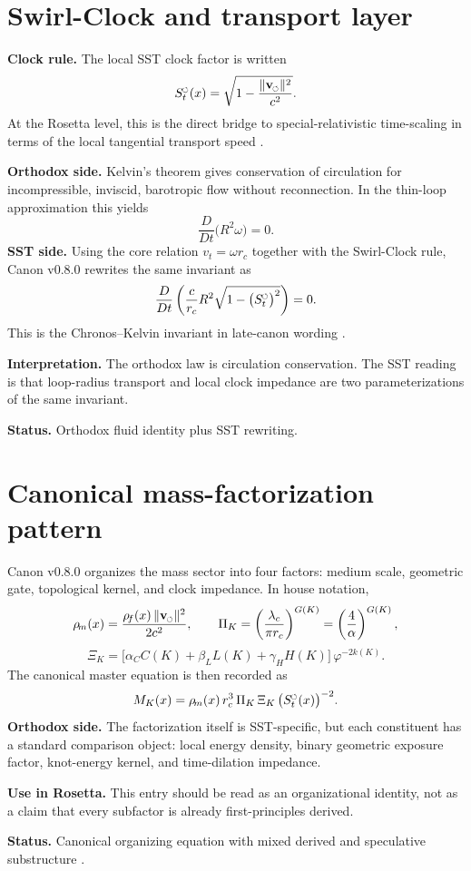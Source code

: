 \documentclass[11pt,a4paper]{article}
\newcommand{\swirlarrow}{%
  \mathchoice{\mkern-2mu\scriptstyle\boldsymbol{\circlearrowleft}}%
  {\mkern-2mu\scriptstyle\boldsymbol{\circlearrowleft}}%
  {\mkern-2mu\scriptscriptstyle\boldsymbol{\circlearrowleft}}%
  {\mkern-2mu\scriptscriptstyle\boldsymbol{\circlearrowleft}}%
}
\newcommand{\vswirl}{\mathbf{v}_{\swirlarrow}}
\newcommand{\rhoF}{\rho_{\!f}}
\newcommand{\rhoM}{\rho_{\!m}}
\newcommand{\vnorm}{\lVert \vswirl \rVert}
\newcommand{\rc}{r_c}
\newcommand{\RosettaCard}[1]{\begin{tcolorbox}[colback=blue!4,colframe=blue!60!black,boxrule=0.6pt,arc=3pt,title={#1}]}
\newcommand{\EndRosettaCard}{\end{tcolorbox}}
\begin{document}
\section{Swirl-Clock and transport layer}
\RosettaCard{Rosetta Card 2: Swirl-Clock and Chronos--Kelvin transport}
\textbf{Clock rule.} The local SST clock factor is written
\[
S_t^{\swirlarrow}(x)=\sqrt{1-\frac{\vnorm^2}{c^2}}.
\]
At the Rosetta level, this is the direct bridge to special-relativistic time-scaling in terms of the local tangential transport speed \cite{SSTCanon08}.\par
\medskip
\textbf{Orthodox side.} Kelvin's theorem gives conservation of circulation for incompressible, inviscid, barotropic flow without reconnection. In the thin-loop approximation this yields
\[
\frac{D}{Dt}\bigl(R^2\omega\bigr)=0.
\]
\textbf{SST side.} Using the core relation \(v_t=\omega\rc\) together with the Swirl-Clock rule, Canon v0.8.0 rewrites the same invariant as
\[
\frac{D}{Dt}\left(\frac{c}{\rc}R^2\sqrt{1-\bigl(S_t^{\swirlarrow}\bigr)^2}\right)=0.
\]
This is the Chronos--Kelvin invariant in late-canon wording \cite{SSTCanon08, Helmholtz1858, Batchelor1967, Saffman1992}.\par
\medskip
\textbf{Interpretation.} The orthodox law is circulation conservation. The SST reading is that loop-radius transport and local clock impedance are two parameterizations of the same invariant.\par
\medskip
\textbf{Status.} Orthodox fluid identity plus SST rewriting.
\EndRosettaCard

\section{Canonical mass-factorization pattern}
\RosettaCard{Rosetta Card 3: master mass organization}
Canon v0.8.0 organizes the mass sector into four factors: medium scale, geometric gate, topological kernel, and clock impedance. In house notation,
\[
\rhoM(x)=\frac{\rhoF(x)\,\vnorm^2}{2c^2},
\qquad
\Pi_K = \left(\frac{\lambda_c}{\pi \rc}\right)^{G(K)} = \left(\frac{4}{\alpha}\right)^{G(K)},
\]
\[
\Xi_K = \bigl[\alpha_C C(K)+\beta_L L(K)+\gamma_H H(K)\bigr]\,\varphi^{-2k(K)}.
\]
The canonical master equation is then recorded as
\[
M_K(x)=\rhoM(x)\,\rc^3\,\Pi_K\,\Xi_K\,\bigl(S_t^{\swirlarrow}(x)\bigr)^{-2}.
\]
\textbf{Orthodox side.} The factorization itself is SST-specific, but each constituent has a standard comparison object: local energy density, binary geometric exposure factor, knot-energy kernel, and time-dilation impedance.\par
\medskip
\textbf{Use in Rosetta.} This entry should be read as an organizational identity, not as a claim that every subfactor is already first-principles derived.\par
\medskip
\textbf{Status.} Canonical organizing equation with mixed derived and speculative substructure \cite{SSTCanon08}.
\EndRosettaCard
\end{document}
